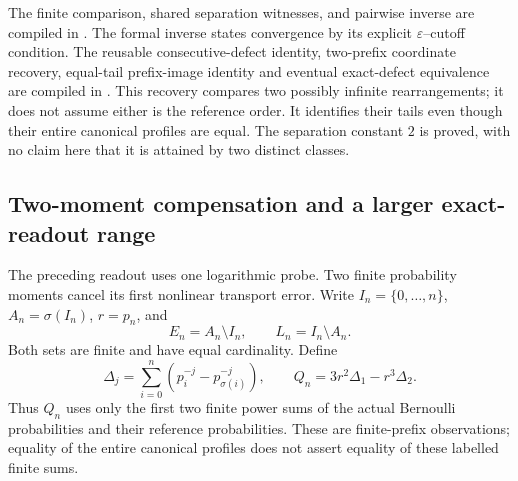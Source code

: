 \documentclass[11pt]{article}
\theoremstyle{definition}
\begin{document}
\begin{flushleft}
The finite comparison, shared separation witnesses, and pairwise inverse
are compiled in .
The formal inverse states convergence by its explicit
$\varepsilon$--cutoff condition. The reusable consecutive-defect identity,
two-prefix coordinate recovery, equal-tail prefix-image identity and
eventual exact-defect equivalence are compiled in
.
This recovery compares two possibly infinite rearrangements; it does not
assume either is the reference order. It identifies their tails even
though their entire canonical profiles are equal. The separation
constant $2$ is proved, with no claim here that it is attained by two
distinct classes.
\end{flushleft}

\subsection{Two-moment compensation and a larger exact-readout range}

The preceding readout uses one logarithmic probe. Two finite probability
moments cancel its first nonlinear transport error. Write
$I_n=\{0,\ldots,n\}$, $A_n=\sigma(I_n)$, $r=p_n$, and
\[
 E_n=A_n\setminus I_n,\qquad L_n=I_n\setminus A_n.
\]
Both sets are finite and have equal cardinality. Define
\[
 \Delta_j=\sum_{i=0}^n\left(p_i^{-j}-p_{\sigma(i)}^{-j}\right),
 \qquad Q_n=3r^2\Delta_1-r^3\Delta_2.
\]
Thus $Q_n$ uses only the first two finite power sums of the actual
Bernoulli probabilities and their reference probabilities. These are
finite-prefix observations; equality of the entire canonical profiles
does not assert equality of these labelled finite sums.
\end{document}
